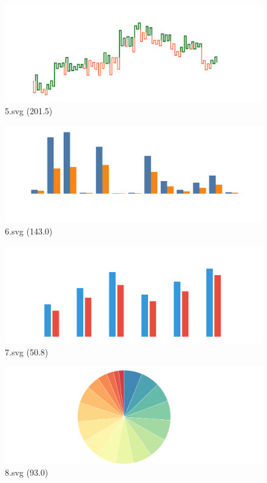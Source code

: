 \documentclass[journal]{IEEEtran}
\begin{document}
\begin{figure}[!htbp]
\centering
\begin{minipage}{0.233\columnwidth}
\centering
\includegraphics[width=\textwidth]{Train_set/5.pdf}
{5.svg (201.5)}
\end{minipage}
\hfill
\begin{minipage}{0.233\columnwidth}
\centering
\includegraphics[width=\textwidth]{Train_set/6.pdf}
{6.svg (143.0)}
\end{minipage}
\hfill
\begin{minipage}{0.233\columnwidth}
\centering
\includegraphics[width=\textwidth]{Train_set/7.pdf}
{7.svg (50.8)}
\end{minipage}
\hfill
\begin{minipage}{0.233\columnwidth}
\centering
\includegraphics[width=\textwidth]{Train_set/8.pdf}
{8.svg (93.0)}
\end{minipage}
\end{figure}
\end{document}
